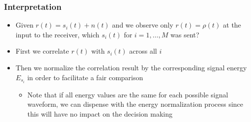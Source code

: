 \documentclass[10pt]{beamer}
\begin{document}
\frame
{
  \frametitle{Interpretation}

  \begin{itemize}
    \item Given $r(t)=s_i(t)+n(t)$ and we observe only $r(t)=\rho(t)$ at the input to the receiver, which $s_i(t)$ for $i=1,\ldots,M$ was sent?
    \item First we correlate $r(t)$ with $s_i(t)$ across all $i$
    \item Then we normalize the correlation result by the corresponding signal energy $E_{s_i}$ in order to facilitate a fair comparison
    \begin{itemize}
        \item Note that if all energy values are the same for each possible signal waveform, we can dispense with the energy normalization process since this will have no impact on the decision making
    \end{itemize}
  \end{itemize}

}
\end{document}
